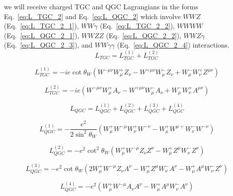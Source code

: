 we will receive charged TGC and QGC Lagrangians in the forms Eq.~\ref{eq:L_TGC_2} and Eq.~\ref{eq:L_QGC_2} which involve $WWZ$ (Eq.~\ref{eq:L_TGC_2_1}), $WW\gamma$ (Eq.~\ref{eq:L_TGC_2_2}), $WWWW$ (Eq.~\ref{eq:L_QGC_2_1}), $WWZZ$ (Eq.~\ref{eq:L_QGC_2_2}), $WWZ\gamma$ (Eq.~\ref{eq:L_QGC_2_3}), and $WW\gamma\gamma$ (Eq.~\ref{eq:L_QGC_2_4}) interactions.\\


\begin{equation} \label{eq:L_TGC_2}
L_{TGC} = L_{TGC}^{(1)} + L_{TGC}^{(2)}
\end{equation}

\begin{equation} \label{eq:L_TGC_2_1}
L_{TGC}^{(1)} = -ie \cot \theta_W (W^{-\mu\nu} W^{+}_\mu Z_\nu - W^{+\mu\nu} W^-_\mu Z_\nu +W^-_\mu W^+_\nu Z^{\mu\nu}) 
\end{equation}

\begin{equation} \label{eq:L_TGC_2_2}
L_{TGC}^{(2)} = - ie(W^{-\mu\nu}W^+_\mu A_\nu - W^{+\mu\nu}W^-_\mu A_\nu + W^-_\mu W^+_\nu A^{\mu\nu})
\end{equation}

\begin{equation} \label{eq:L_QGC_2}
L_{QGC} = L_{QGC}^{(1)} + L_{QGC}^{(2)} + L_{QGC}^{(3)} + L_{QGC}^{(4)}
\end{equation}

\begin{equation} \label{eq:L_QGC_2_1}
L_{QGC}^{(1)} = -\frac{e^2}{2\sin^2 \theta_W}(W^+_\mu W^{-\mu}W^+_\nu W^{-\nu} - W^+_\mu W^{\mu +} W^-_\nu W^{-\nu})
\end{equation}

\begin{equation} \label{eq:L_QGC_2_2}
L_{QGC}^{(2)} = - e^2 \cot^2 \theta_W (W^+_\mu W^{-\mu} Z_\nu Z^{\nu} - W^+_\mu Z^{\mu} W^-_\nu Z^{\nu})
\end{equation}

\begin{equation} \label{eq:L_QGC_2_3}
L_{QGC}^{(3)} = - e^2 \cot \theta_W (2 W_\mu^+ W^{-\mu} Z_\nu A^{\nu} - W^{+}_\mu Z^\mu W^-_\nu A^\nu - W^{+}_\mu A^\mu W^-_\nu Z^\nu)
\end{equation}

\begin{equation} \label{eq:L_QGC_2_4}
L_{QGC}^{(4)} = - e^2 (W^+_\mu W^{-\mu} A_\nu A^{\nu} - W^+_\mu A^{\mu} W^-_\nu A^{\nu})
\end{equation}


